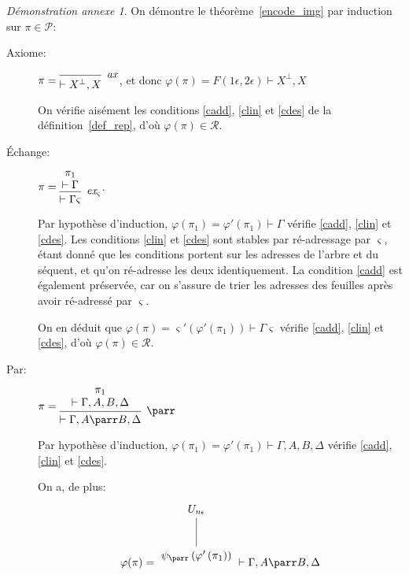 \documentclass[11pt,a4paper]{article}
\theoremstyle{plain}
\theoremstyle{definition}
\theoremstyle{remark}
\newtheorem{demonstrationappendix}{Démonstration annexe}
\newcommand*{\orth}{^\perp}
\newcommand*{\namedproofv}[2]{\hypo{#1}\infer[no rule]{1}{\vdash #2}}
\newcommand*{\axv}[1]{\infer{0}[\ensuremath{\mathit{ax}}]{\vdash #1}}
\newcommand*{\parrv}[1]{\infer{1}[\ensuremath{\parr}]{\vdash #1}}
\newcommand*{\permv}[2]{\infer{1}[\ensuremath{\textit{ex}_{#1}}]{\vdash #2}}
\newcommand*{\permapp}[2]{#2 #1}
\newcommand*{\someperm}{\varsigma}
\newcommand*{\someproof}{\pi}
\newcommand*{\sequent}{\Gamma}
\newcommand*{\sequentbis}{\Delta}
\newcommand*{\proofs}{\ensuremath{\mathcal{P}}}
\newcommand*{\representations}{\ensuremath{\mathcal{R}}}
\newcommand*{\encode}{\ensuremath{\varphi}}
\begin{document}
\begin{demonstrationappendix}
    \label{proof_img_encode}
    On démontre le théorème~\ref{encode_img} par induction sur $\someproof \in \proofs$:
    \begin{description}
    \item[Axiome:] $\someproof =
    \begin{prooftree}
        \axv{X\orth, X}
    \end{prooftree}$,
    et donc $\encode \left( \someproof \right) = F(1 \epsilon, 2 \epsilon) \vdash X\orth, X$

    On vérifie aisément les conditions \ref{cadd}, \ref{clin} et \ref{cdes} de la définition~\ref{def_rep}, d'où $\encode \left( \someproof \right) \in \representations$.

    \item[Échange:] $\someproof =
    \begin{prooftree}
        \namedproofv{\pi_1}{\sequent}
        \permv{\someperm}{\permapp{\someperm}{\sequent}}
    \end{prooftree}$.
    
    Par hypothèse d'induction, $\encode \left( \pi_1 \right) = \encode ' \left( \pi_1 \right) \vdash \sequent$ vérifie \ref{cadd}, \ref{clin} et \ref{cdes}. Les conditions \ref{clin} et \ref{cdes} sont stables par ré-adressage par $\someperm$, étant donné que les conditions portent sur les adresses de l'arbre et du séquent, et qu'on ré-adresse les deux identiquement. La condition \ref{cadd} est également préservée, car on s'assure de trier les adresses des feuilles après avoir ré-adressé par $\someperm$.

    On en déduit que $\encode \left( \someproof \right) = \someperm' \left( \encode ' \left( \pi_1 \right) \right) \vdash \permapp{\someperm}{\sequent}$ vérifie \ref{cadd}, \ref{clin} et \ref{cdes}, d'où $\encode \left( \someproof \right) \in \representations$.

    \item[Par:] $\someproof =
    \begin{prooftree}
      \namedproofv{\pi_1}{\sequent, A, B, \sequentbis}
      \parrv{\sequent, A \parr B, \sequentbis}
    \end{prooftree}$

    Par hypothèse d'induction, $\encode \left( \pi_1 \right) = \encode ' \left( \pi_1 \right) \vdash \sequent, A, B, \sequentbis$ vérifie \ref{cadd}, \ref{clin} et \ref{cdes}.
    
    On a, de plus:
    \begin{equation*}
    \encode ( \someproof ) = \begin{tikzpicture}%
    [level distance=1.5cm,
    level 2/.style={sibling distance=3.5cm}]
    \node {$U_{n \epsilon}$}
        child {node {$\psi_\parr \left( \encode' \left( \pi_1 \right) \right)$}
    };
    \end{tikzpicture} \vdash \sequent, A \parr B, \sequentbis
    \end{equation*}


\end{description}
\end{demonstrationappendix}
\end{document}
